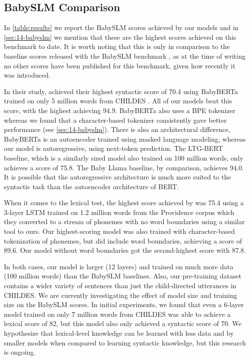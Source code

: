 \subsection{BabySLM Comparison}
\label{sec:14-babyslmcomparison}

In \cref{table:results} we report the BabySLM scores achieved by our models and in \cref{sec:14-babyslm} we mention that these are the highest scores achieved on this benchmark to date. It is worth noting that this is only in comparison to the baseline scores released with the BabySLM benchmark \citep{lavechin}, as at the time of writing no other scores have been published for this benchmark, given how recently it was introduced.

In their study, \citet{lavechin} achieved their highest syntactic score of 70.4 using BabyBERTa \citep{huebner-etal-2021-babyberta} trained on only 5 million words from CHILDES \citep{macwhinney1985child}. All of our models beat this score, with the highest achieving 94.9. BabyBERTa also uses a BPE tokenizer whereas we found that a character-based tokenizer consistently gave better performance (see \cref{sec:14-babyslm}). There is also an architectural difference, BabyBERTa is an autoencoder trained using masked language modeling, whereas our model is autoregressive, using next-token prediction. The LTG-BERT baseline, which is a similarly sized model also trained on 100 million words, only achieves a score of 75.8. The Baby Llama baseline, by comparison, achieves 94.0. It is possible that the autoregressive architecture is much more suited to the syntactic task than the autoencoder architecture of BERT. 

When it comes to the lexical test, the highest score achieved by \citet{lavechin} was 75.4 using a 3-layer LSTM trained on 1.2 million words from the Providence corpus \citep{borschinger-etal-2013-joint} which they converted to a stream of phonemes with no word boundaries using a similar tool to ours. Our highest-scoring model was also trained with character-based tokenization of phonemes, but did include word boundaries, achieving a score of 89.6. Our model without word boundaries got the second-highest score with 87.8.

In both cases, our model is larger (12 layers) and trained on much more data (100 million words) than the BabySLM baselines. Also, our pre-training dataset contains a wider variety of sentences than just the child-directed utterances in CHILDES. We are currently investigating the effect of model size and training size on the BabySLM scores. In initial experiments, we found that even a 6-layer model trained on only 7 million words from CHILDES was able to achieve a lexical score of 82, but this model also only achieved a syntactic score of 70. We hypothesize that lexical-level knowledge can be learned with less data and by smaller models when compared to learning syntactic knowledge, but this research is ongoing.

